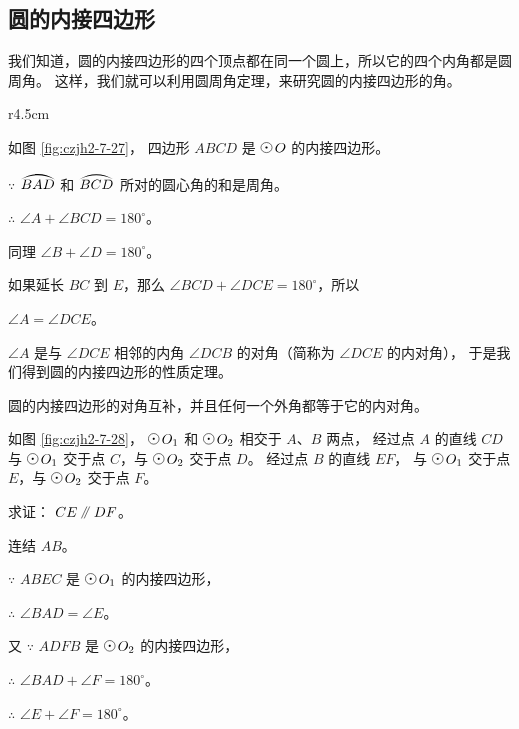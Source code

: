 \subsection{圆的内接四边形}\label{subsec:czjh2-7-6}
\begin{enhancedline}

我们知道，圆的内接四边形的四个顶点都在同一个圆上，所以它的四个内角都是圆周角。
这样，我们就可以利用圆周角定理，来研究圆的内接四边形的角。

\begin{wrapfigure}[9]{r}{4.5cm}
    \centering
    
    \caption{}\label{fig:czjh2-7-27}
\end{wrapfigure}

如图 \ref{fig:czjh2-7-27}， 四边形 $ABCD$ 是 $\yuan\,O$ 的内接四边形。

$\because$ \quad $\yuanhu{BAD}$ 和 $\yuanhu{BCD}$ 所对的圆心角的和是周角。

$\therefore$ \quad $\angle A + \angle BCD = 180^\circ$。

同理 $\angle B + \angle D = 180^\circ$。

如果延长 $BC$ 到 $E$，那么 $\angle BCD + \angle DCE = 180^\circ$，所以

$\angle A = \angle DCE$。

$\angle A$ 是与 $\angle DCE$ 相邻的内角 $\angle DCB$ 的对角（简称为 $\angle DCE$ 的内对角），
于是我们得到圆的内接四边形的性质定理。

\begin{dingli}[定理]
    圆的内接四边形的对角互补，并且任何一个外角都等于它的内对角。
\end{dingli}


\liti 如图 \ref{fig:czjh2-7-28}， $\yuan\,O_1$ 和 $\yuan\,O_2$ 相交于 $A$、$B$ 两点，
经过点 $A$ 的直线 $CD$ 与 $\yuan\,O_1$ 交于点 $C$，与 $\yuan\,O_2$ 交于点 $D$。
经过点 $B$ 的直线 $EF$， 与 $\yuan\,O_1$ 交于点 $E$，与 $\yuan\,O_2$ 交于点 $F$。

求证： $CE \pingxing DF$。

\zhengming 连结 $AB$。

$\because$ \quad $ABEC$ 是 $\yuan\,O_1$ 的内接四边形，

$\therefore$ \quad $\angle BAD = \angle E$。

又 $\because$ \quad $ADFB$ 是 $\yuan\,O_2$ 的内接四边形，

$\therefore$ \quad $\angle BAD + \angle F = 180^\circ$。

$\therefore$ \quad $\angle E + \angle F = 180^\circ$。


\end{enhancedline}
